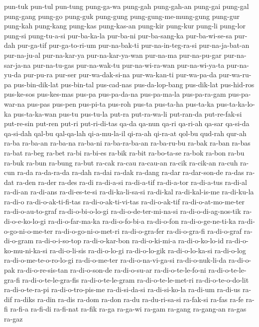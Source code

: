 {pun-tuk pun-tul pun-tung pung-ga-wa pung-gah pung-gah-an pung-gai pung-gal
pung-gang pung-go pung-guk pung-gung pung-gung-me-mung-gung pung-gur
pung-kah pung-kang pung-kas pung-kas-an pung-kir pung-kur pung-li pung-lor
pung-si pung-tu-a-si pur-ba-ka-la pur-ba-ni pur-ba-sang-ka pur-ba-wi-se-sa
pur-dah pur-ga-tif pur-ga-to-ri-um pur-na-bak-ti pur-na-in-teg-ra-si
pur-na-ja-bat-an pur-na-ju-al pur-na-kar-ya pur-na-kar-ya-wan pur-na-ma
pur-na-pu-gar pur-na-sar-ja-na pur-na-tu-gas pur-na-wak-tu
pur-na-wi-ra-wan pur-na-wi-ya-ta pur-na-yu-da pur-pu-ra pur-ser
pur-wa-dak-si-na pur-wa-kan-ti pur-wa-pa-da pur-wa-ru-pa pus-bin-dik-lat
pus-bin-tal pus-cad-nas pus-da-lop-bang pus-dik-lat pus-hid-ros pus-ke-sos
pus-kes-mas pus-pa pus-pa-da-na pus-pa-ma-la pus-pa-ra-gam pus-pa-war-na
pus-pas pus-pen pus-pi-ta pus-roh pus-ta pus-ta-ha pus-ta-ka
pus-ta-ka-lo-ka pus-ta-ka-wan pus-tu pus-tu-la put-ra put-ra-wa-li
put-ran-da put-re-fak-si put-re-sin put-ren put-ri put-ri-di-tas qa-da
qa-nun qa-ri qa-ri-ah qa-sar qa-si-da qa-si-dah qal-bu qal-qa-lah
qi-a-mu-la-il qi-ra-ah qi-ra-at qol-bu qud-rah qur-ah ra-ba ra-ba-an
ra-ba-na ra-ba-ni ra-ba-ra-ba-an ra-ba-ru-bu ra-bak ra-ban ra-bas ra-bat
ra-beg ra-bet ra-bi ra-bi-es ra-bik ra-bit ra-bo-ta-se ra-bok ra-bon ra-bu
ra-buk ra-bun ra-bung ra-but ra-cak ra-cau ra-cau-an ra-cik ra-cik-an
ra-cuh ra-cun ra-da ra-da-ra-da ra-dah ra-dai ra-dak ra-dang ra-dar
ra-dar-son-de ra-das ra-dat ra-den ra-der ra-des ra-di ra-di-a-si
ra-di-a-tif ra-di-a-tor ra-di-a-tus ra-di-al ra-di-an ra-di-ans
ra-di-es-te-si ra-di-ka-li-sa-si ra-di-kal ra-di-kal-is-me ra-di-ku-la
ra-di-o ra-di-o-ak-ti-fi-tas ra-di-o-ak-ti-vi-tas ra-di-o-ak-tif
ra-di-o-at-mo-me-ter ra-di-o-au-to-graf ra-di-o-bi-o-lo-gi
ra-di-o-de-ter-mi-na-si ra-di-o-di-ag-nos-tik ra-di-o-e-ko-lo-gi
ra-di-o-far-ma-ka ra-di-o-fo-bi-a ra-di-o-fon ra-di-o-ge-ne-ti-ka
ra-di-o-go-ni-o-me-ter ra-di-o-go-ni-o-met-ri ra-di-o-gra-fer
ra-di-o-gra-fi ra-di-o-graf ra-di-o-gram ra-di-o-i-so-top ra-di-o-kar-bon
ra-di-o-ki-mi-a ra-di-o-ko-lo-id ra-di-o-ko-mu-ni-ka-si ra-di-o-li-sis
ra-di-o-lo-gi ra-di-o-lo-gik ra-di-o-lo-ka-si ra-di-o-log
ra-di-o-me-te-o-ro-lo-gi ra-di-o-me-ter ra-di-o-na-vi-ga-si
ra-di-o-nuk-li-da ra-di-o-pak ra-di-o-re-sis-tan ra-di-o-son-de
ra-di-o-su-ar ra-di-o-te-le-fo-ni ra-di-o-te-le-gra-fi
ra-di-o-te-le-gra-fis ra-di-o-te-le-gram ra-di-o-te-le-met-ri
ra-di-o-te-o-do-lit ra-di-o-te-ra-pi ra-di-o-tro-pis-me ra-di-si-da-si
ra-di-si-ko-la ra-di-um ra-di-us ra-dif ra-diks ra-din ra-dis ra-dom
ra-don ra-du ra-du-ri-sa-si ra-fak-si ra-fas ra-fe ra-fi ra-fi-a ra-fi-di
ra-fi-nat ra-fik ra-ga ra-ga-wi ra-gam ra-gang ra-gang-an ra-gas ra-gaz
}

